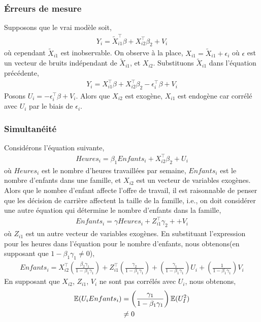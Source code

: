 \documentclass[12pt, reqno]{amsart}
\begin{document}
\subsubsection*{\'Erreurs de mesure}
Supposons que le vrai modèle soit,
\begin{align*}
Y_i = \tilde{X}_{i1}^\top\beta + X_{i2}^\top\beta_2 + V_i
\end{align*}
où cependant $\tilde{X}_{i1}$ est inobservable. On observe à la place, $X_{i1} =  \tilde{X}_{i1}+\epsilon_i$ où $\epsilon$ est un vecteur de bruits indépendant de $\tilde{X}_{i1}$, et $X_{i2}$. Substituons $\tilde{X}_{i1}$ dans l'équation précédente,
\begin{align*}
Y_i = X_{i1} ^\top\beta + X_{i2}^\top\beta_2 - \epsilon_i^\top\beta + V_i
\end{align*}
Posons $U_i = - \epsilon_i^\top\beta + V_i$. Alors que $ X_{i2}$ est exogène, $X_{i1}$ est endogène car  corrélé avec $U_i$ par le biais de $\epsilon_i$.
\subsubsection*{Simultanéité}
Considérons l'équation suivante,
\begin{align*}
Heures_i = \beta_1Enfants_i + X_{i2}^\top\beta_2 + U_i
\end{align*}
où $Heures_i$ est le nombre d'heures travaillées par semaine, $Enfants_i$ est le nombre d'enfants dans une famille, et $X_{i2}$ est un vecteur de variables exogènes. Alors que le nombre d'enfant affecte l'offre de travail, il est raisonnable de penser que les décision de carrière affectent la taille de la famille, i.e., on doit considérer une autre équation qui détermine le nombre d'enfants dans la famille,
\begin{align*}
Enfants_i = \gamma Heures_i + Z_{i1}^\top\gamma_2+ + V_i
\end{align*}
où $ Z_{i1}$ est un autre vecteur de variables exogènes. En substituant l'expression pour les heures dans l'équation pour le nombre d'enfants, nous obtenons(en supposant que $1-\beta_1\gamma_1\neq 0$),
\begin{align*}
Enfants_i  = X_{i2}^\top\left(\frac{\beta_2\gamma_1}{1-\beta_1\gamma_1}\right) + Z_{i1}^\top \left(\frac{\gamma_2}{1-\beta_1\gamma_1}\right) + \left(\frac{\gamma_1}{1-\beta_1\gamma_1}\right)U_i + \left(\frac{1}{1-\beta_1\gamma_1}\right)V_i
\end{align*}
En supposant que $X_{i2}$, $Z_{i1}$, $V_i$ ne sont pas corrélés avec $U_i$, nous obtenons,
\begin{align*}
\mathbb{E}(U_iEnfants_i) &= \left(\frac{\gamma_1}{1-\beta_1\gamma_1}\right)\mathbb{E}(U_I^2)\\
&\neq 0
\end{align*}
\end{document}

